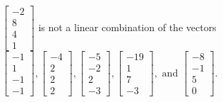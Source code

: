 \begin{exercise}
\begin{exerciseStatement}
  \end{exerciseStatement}
  \begin{exerciseAnswer}
   \(\left[\begin{array}{c}
-2 \\
8 \\
4 \\
1
\end{array}\right]\) 
  	 is not  
	a linear combination of the vectors \(\left[\begin{array}{c}
-1 \\
1 \\
-1 \\
-1
\end{array}\right] , \left[\begin{array}{c}
-4 \\
2 \\
2 \\
2
\end{array}\right] , \left[\begin{array}{c}
-5 \\
-2 \\
2 \\
-3
\end{array}\right] , \left[\begin{array}{c}
-19 \\
1 \\
7 \\
-3
\end{array}\right] , \text{ and } \left[\begin{array}{c}
-8 \\
-1 \\
5 \\
0
\end{array}\right]\).

	
  


  \end{exerciseAnswer}
\end{exercise}